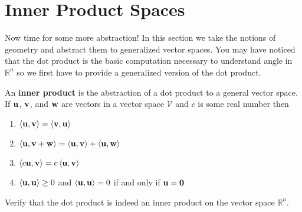 \newpage\section{Inner Product Spaces}
Now time for some more abstraction!  In this section we take the notions of geometry and
abstract them to generalized vector spaces.  You may have noticed that the dot product is
the basic computation necessary to understand angle in $\mathbb{R}^n$ so we first have to
provide a generalized version of the dot product.

\begin{definition}\label{def:inner_product}
    An {\bf inner product} is the abstraction of a dot product to a general vector space.
    If ${\bf u}$, ${\bf v}$, and ${\bf w}$ are vectors in a vector space $\mathcal{V}$ and $c$ is some real
    number then
        \begin{enumerate}
            \item $\left< {\bf u},{\bf v}\right> = \left<{\bf v},{\bf u}\right>$
            \item $\left< {\bf u},{\bf v} + {\bf w}\right> = \left< {\bf u},{\bf v}\right> + \left<
                {\bf u},{\bf w}\right>$
            \item $\left< c{\bf u},{\bf v}\right> = c \left< {\bf u},{\bf v}\right>$
            \item $\left< {\bf u},{\bf u}\right> \ge 0$ and $\left<{\bf u},{\bf u}\right>=0$ if and only if
                ${\bf u}={\bf 0}$
        \end{enumerate}
\end{definition}

\begin{problem}
    Verify that the dot product is indeed an inner product on the vector space
    $\mathbb{R}^n$. 
\end{problem}


